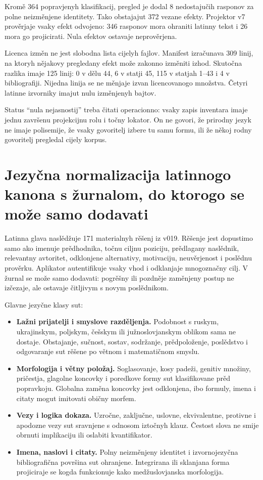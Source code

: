 \documentclass[11pt]{article}
\begin{document}
Kromě 364 popravjenyh klasifikacij, pregled je dodal 8 nedostajučih rasponov za polne neizměnjene identitety. Tako obstajajut 372 vezane efekty. Projektor v7 prověrjaje vsaky efekt odvojeno: 346 rasponov mora ohraniti latinny tekst i 26 mora go projicirati. Nula efektov ostavaje neprověrjena.

Licenca izměn ne jest slobodna lista cijelyh fajlov. Manifest izračunava 309 linij, na ktoryh nějakovy pregledany efekt može zakonno izměniti izhod. Skutočna razlika imaje 125 linij: 0 v dělu 44, 6 v statji 45, 115 v statjah 1--43 i 4 v bibliografiji. Nijedna linija se ne měnjaje izvan licencovanogo množstva. Četyri latinne izvorniky imajut nulu izměnjenyh bajtov.

Status ``nula nejasnostij'' treba čitati operacionno: vsaky zapis inventara imaje jednu završenu projekcijnu rolu i točny lokator. On ne govori, že prirodny jezyk ne imaje polisemije, že vsaky govoritelj izbere tu samu formu, ili že někoj rodny govoritelj pregledal cijely korpus.

\section{Jezyčna normalizacija latinnogo kanona s žurnalom, do ktorogo se može samo dodavati}

Latinna glava naslědžuje 171 materialnyh rěšenj iz v019. Rěšenje jest dopustimo samo ako imenuje prědhodnika, točnu ciljnu poziciju, prědlagany naslědnik, relevantny avtoritet, odklonjene alternativy, motivaciju, neuvěrjenost i poslědnu prověrku. Aplikator autentifikuje vsaky vhod i odklanjaje mnogoznačny cilj. V žurnal se može samo dodavati: pogrěšny ili pozdněje zaměnjeny postup ne izčezaje, ale ostavaje čitljivym s novym poslědnikom.

Glavne jezyčne klasy sut:

\begin{itemize}
\item \textbf{Lažni prijatelji i smyslove razděljenja.} Podobnost s ruskym, ukrajinskym, poljskym, češskym ili južnoslovjanskym oblikom sama ne dostaje. Obstajanje, sučnost, sostav, sodržanje, prědpoloženje, poslědstvo i odgovaranje sut rěšene po větnom i matematičnom smyslu.
\item \textbf{Morfologija i větny položaj.} Soglasovanje, kosy padeži, genitiv množiny, pričestja, glagolne koncovky i poredkove formy sut klasifikovane prěd popravkoju. Globalna zaměna koncovky jest odklonjena, ibo formuly, imena i citaty mogut imitovati običny morfem.
\item \textbf{Vezy i logika dokaza.} Uzročne, zaključne, uslovne, ekvivalentne, protivne i apodozne vezy sut sravnjene s odnosom iztočnyh klauz. Čestost slova ne smije obrnuti implikaciju ili oslabiti kvantifikator.
\item \textbf{Imena, naslovi i citaty.} Polny neizměnjeny identitet i izvornojezyčna bibliografična površina sut ohranjene. Integrirana ili sklanjana forma projiciraje se kogda funkcionuje kako medžuslovjanska morfologija.
\end{itemize}
\end{document}
